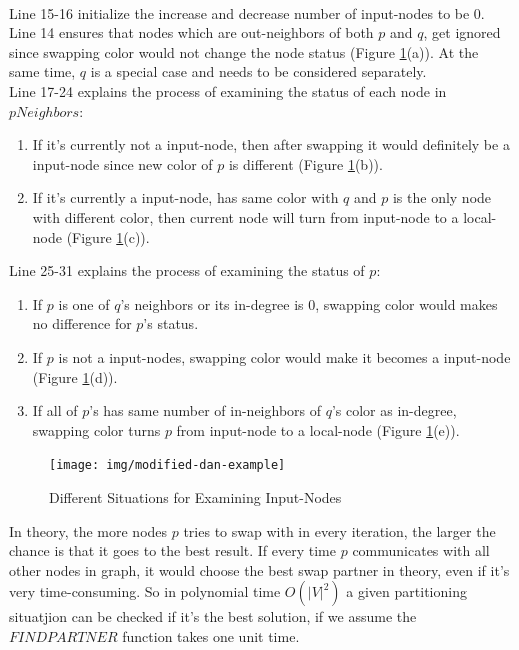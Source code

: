 \\Line 15-16 initialize the increase and decrease number of input-nodes to be 0.
\\Line 14 ensures that nodes which are out-neighbors of both $p$ and $q$, get ignored since swapping color would not change the node status (Figure \ref{fig:modified-dan-example}(a)). At the same time, $q$ is a special case and needs to be considered separately. 
\\Line 17-24 explains the process of examining the status of each node in $pNeighbors$: 
\begin{enumerate}
    \item If it's currently not a input-node, then after swapping it would definitely be a input-node since new color of $p$ is different (Figure \ref{fig:modified-dan-example}(b)).
    \item If it's currently a input-node, has same color with $q$ and $p$ is the only node with different color, then current node will turn from input-node to a local-node (Figure \ref{fig:modified-dan-example}(c)).
\end{enumerate} 
Line 25-31 explains the process of examining the status of $p$:
\begin{enumerate}
    \item If $p$ is one of $q$'s neighbors or its in-degree is 0, swapping color would makes no difference for $p$'s status.
    \item If $p$ is not a input-nodes, swapping color would make it becomes a input-node (Figure \ref{fig:modified-dan-example}(d)).
    \item If all of $p$'s has same number of in-neighbors of $q$'s color as in-degree, swapping color turns $p$ from input-node to a local-node (Figure \ref{fig:modified-dan-example}(e)).
\end{enumerate}
\begin{figure}[h!]
  \caption{Different Situations for Examining Input-Nodes}
  \label{fig:modified-dan-example}
  \centering
    \texttt{[image: img/modified-dan-example]}
\end{figure}
In theory, the more nodes $p$ tries to swap with in every iteration, the larger the chance is that it goes to the best result. If every time $p$ communicates with all other nodes in graph, it would choose the best swap partner in theory, even if it's very time-consuming. So in polynomial time  $O(|V|^2)$ a given partitioning situatjion can be checked if it's the best solution, if we assume the $FINDPARTNER$ function takes one unit time.
